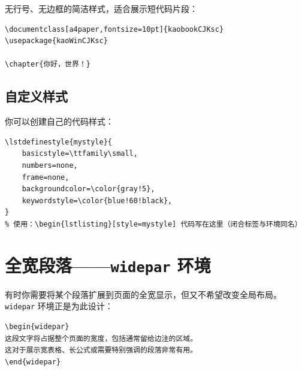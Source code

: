 无行号、无边框的简洁样式，适合展示短代码片段：

\begin{lstlisting}[style=kaolstplain]
\documentclass[a4paper,fontsize=10pt]{kaobookCJKsc}
\usepackage{kaoWinCJKsc}

\chapter{你好，世界！}

\end{lstlisting}

\subsection{自定义样式}

你可以创建自己的代码样式：

\begin{lstlisting}
\lstdefinestyle{mystyle}{
    basicstyle=\ttfamily\small,
    numbers=none,
    frame=none,
    backgroundcolor=\color{gray!5},
    keywordstyle=\color{blue!60!black},
}
% 使用：\begin{lstlisting}[style=mystyle] 代码写在这里（闭合标签与环境同名）
\end{lstlisting}


\section{全宽段落——\texttt{widepar} 环境}


有时你需要将某个段落扩展到页面的全宽显示，但又不希望改变全局布局。
\texttt{widepar} 环境正是为此设计：

\begin{lstlisting}
\begin{widepar}
这段文字将占据整个页面的宽度，包括通常留给边注的区域。
这对于展示宽表格、长公式或需要特别强调的段落非常有用。
\end{widepar}
\end{lstlisting}

